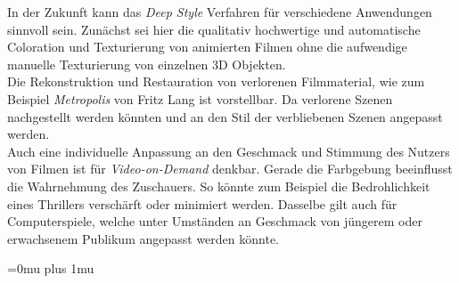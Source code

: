 \documentclass[times, 11pt,twocolumn]{article}
\begin{document}

In der Zukunft kann das \textit{Deep Style} Verfahren für verschiedene Anwendungen sinnvoll sein. Zunächst sei hier die qualitativ hochwertige und automatische Coloration und Texturierung von animierten Filmen ohne die aufwendige manuelle Texturierung von einzelnen 3D Objekten. \\
Die Rekonstruktion und Restauration von verlorenen Filmmaterial, wie zum Beispiel \textit{Metropolis} von Fritz Lang ist vorstellbar. Da verlorene Szenen nachgestellt werden könnten und an den Stil der verbliebenen Szenen angepasst werden.\\
Auch eine individuelle Anpassung an den Geschmack und Stimmung des Nutzers von Filmen ist für \textit{Video-on-Demand} denkbar. Gerade die Farbgebung beeinflusst die Wahrnehmung des Zuschauers. So könnte zum Beispiel die Bedrohlichkeit eines Thrillers verschärft oder minimiert werden. Dasselbe gilt auch für Computerspiele, welche unter Umständen an Geschmack von jüngerem oder erwachsenem Publikum angepasst werden könnte.

 \label{Fazit}



\newpage
\Urlmuskip=0mu plus 1mu\relax %
 

\end{document}
